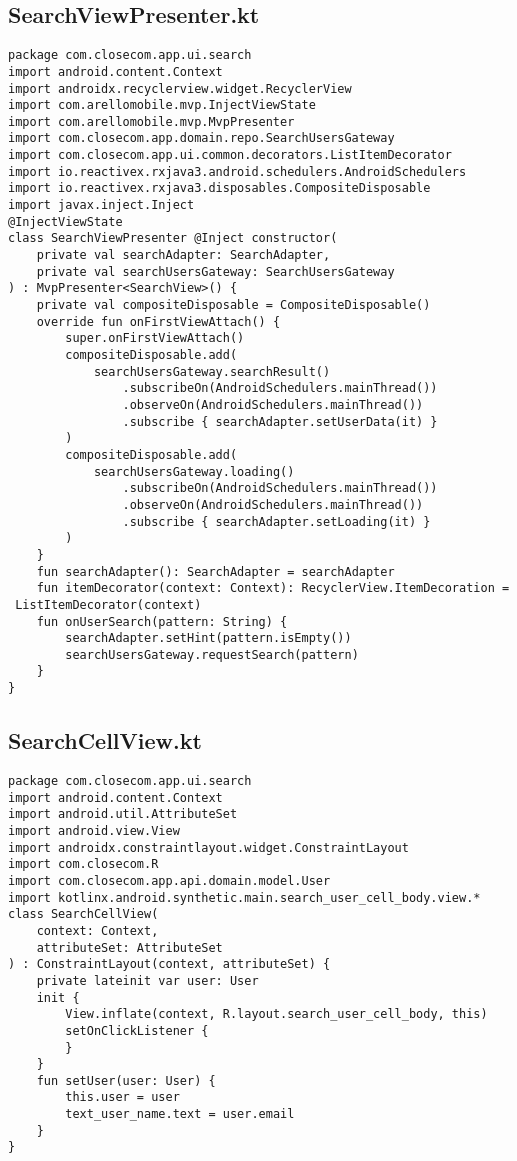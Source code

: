 \documentclass[listing]{espd}
\begin{document}
\subsection{SearchViewPresenter.kt}
\begin{verbatim}
package com.closecom.app.ui.search
import android.content.Context
import androidx.recyclerview.widget.RecyclerView
import com.arellomobile.mvp.InjectViewState
import com.arellomobile.mvp.MvpPresenter
import com.closecom.app.domain.repo.SearchUsersGateway
import com.closecom.app.ui.common.decorators.ListItemDecorator
import io.reactivex.rxjava3.android.schedulers.AndroidSchedulers
import io.reactivex.rxjava3.disposables.CompositeDisposable
import javax.inject.Inject
@InjectViewState
class SearchViewPresenter @Inject constructor(
    private val searchAdapter: SearchAdapter,
    private val searchUsersGateway: SearchUsersGateway
) : MvpPresenter<SearchView>() {
    private val compositeDisposable = CompositeDisposable()
    override fun onFirstViewAttach() {
        super.onFirstViewAttach()
        compositeDisposable.add(
            searchUsersGateway.searchResult()
                .subscribeOn(AndroidSchedulers.mainThread())
                .observeOn(AndroidSchedulers.mainThread())
                .subscribe { searchAdapter.setUserData(it) }
        )
        compositeDisposable.add(
            searchUsersGateway.loading()
                .subscribeOn(AndroidSchedulers.mainThread())
                .observeOn(AndroidSchedulers.mainThread())
                .subscribe { searchAdapter.setLoading(it) }
        )
    }
    fun searchAdapter(): SearchAdapter = searchAdapter
    fun itemDecorator(context: Context): RecyclerView.ItemDecoration =
 ListItemDecorator(context)
    fun onUserSearch(pattern: String) {
        searchAdapter.setHint(pattern.isEmpty())
        searchUsersGateway.requestSearch(pattern)
    }
}
\end{verbatim}

\subsection{SearchCellView.kt}
\begin{verbatim}
package com.closecom.app.ui.search
import android.content.Context
import android.util.AttributeSet
import android.view.View
import androidx.constraintlayout.widget.ConstraintLayout
import com.closecom.R
import com.closecom.app.api.domain.model.User
import kotlinx.android.synthetic.main.search_user_cell_body.view.*
class SearchCellView(
    context: Context,
    attributeSet: AttributeSet
) : ConstraintLayout(context, attributeSet) {
    private lateinit var user: User
    init {
        View.inflate(context, R.layout.search_user_cell_body, this)
        setOnClickListener {
        }
    }
    fun setUser(user: User) {
        this.user = user
        text_user_name.text = user.email
    }
}
\end{verbatim}
\end{document}
